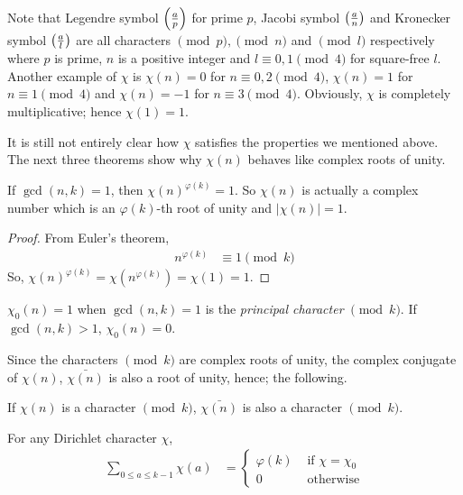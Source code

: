 \documentclass[elemannt.tex]{subfile}
\begin{document}
	Note that Legendre symbol $\qr{a}{p}$ for prime $p$, Jacobi symbol $\qr{a}{n}$ and Kronecker symbol $\qr{a}{l}$ are all characters $\pmod{p},\pmod{n}$ and $\pmod{l}$ respectively where $p$ is prime, $n$ is a positive integer and $l\equiv0,1\pmod{4}$ for square-free $l$. Another example of $\chi$ is $\chi(n)=0$ for $n\equiv0,2\pmod{4}$, $\chi(n)=1$ for $n\equiv1\pmod4$ and $\chi(n)=-1$ for $n\equiv3\pmod{4}$. Obviously, $\chi$ is completely multiplicative; hence $\chi(1)=1$.

	It is still not entirely clear how $\chi$ satisfies the properties we mentioned above. The next three theorems show why $\chi(n)$ behaves like complex roots of unity.
		\begin{proposition}
			If $\gcd(n,k)=1$, then $\chi(n)^{\varphi(k)}=1$. So $\chi(n)$ is actually a complex number which is an $\varphi(k)$-th root of unity and $|\chi(n)|=1$.
		\end{proposition}

		\begin{proof}
			From Euler's theorem,
				\begin{align*}
					n^{\varphi(k)}
						& \equiv1\pmod{k}
				\end{align*}
			So, $\chi(n)^{\varphi(k)}=\chi(n^{\varphi(k)})=\chi(1)=1$.
		\end{proof}

		\begin{definition}
			$\chi_{0}(n)=1$ when $\gcd(n,k)=1$ is the \textit{principal character} $\pmod{k}$. If $\gcd(n,k)>1$, $\chi_{0}(n)=0$.
		\end{definition}
	Since the characters $\pmod{k}$ are complex roots of unity, the complex conjugate of $\chi(n)$, $\bar{\chi(n)}$ is also a root of unity, hence; the following.
		\begin{proposition}
			If $\chi(n)$ is a character $\pmod{k}$, $\bar{\chi(n)}$ is also a character $\pmod{k}$.
		\end{proposition}

		\begin{proposition}\label{pro:sum-for-residues}
			For any Dirichlet character $\chi$,
				\begin{align*}
					\sum_{0\leq a\leq k-1}\chi(a)
						& =
							\begin{cases}
								\varphi(k)& \mbox{ if }\chi=\chi_{0}\\
								0& \mbox{ otherwise}
							\end{cases}
				\end{align*}

		\end{proposition}
\end{document}
